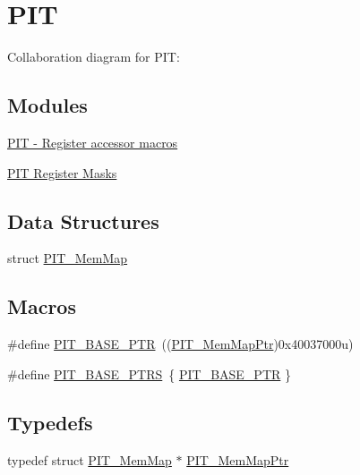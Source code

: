 \hypertarget{group___p_i_t___peripheral}{}\section{P\+IT}
\label{group___p_i_t___peripheral}
Collaboration diagram for P\+IT\+:
\subsection*{Modules}
\begin{DoxyCompactItemize}
\item 
\hyperlink{group___p_i_t___register___accessor___macros}{P\+I\+T -\/ Register accessor macros}
\item 
\hyperlink{group___p_i_t___register___masks}{P\+I\+T Register Masks}
\end{DoxyCompactItemize}
\subsection*{Data Structures}
\begin{DoxyCompactItemize}
\item 
struct \hyperlink{struct_p_i_t___mem_map}{P\+I\+T\+\_\+\+Mem\+Map}
\end{DoxyCompactItemize}
\subsection*{Macros}
\begin{DoxyCompactItemize}
\item 
\#define \hyperlink{group___p_i_t___peripheral_ga70be45f58402a8e6d2ce4df7b23aa41c}{P\+I\+T\+\_\+\+B\+A\+S\+E\+\_\+\+P\+TR}~((\hyperlink{group___p_i_t___peripheral_ga4efe9d2676c775562cb282254af9a937}{P\+I\+T\+\_\+\+Mem\+Map\+Ptr})0x40037000u)
\item 
\#define \hyperlink{group___p_i_t___peripheral_ga403e0ed71b80cfe3e085fe6b56b5eff0}{P\+I\+T\+\_\+\+B\+A\+S\+E\+\_\+\+P\+T\+RS}~\{ \hyperlink{group___p_i_t___peripheral_ga70be45f58402a8e6d2ce4df7b23aa41c}{P\+I\+T\+\_\+\+B\+A\+S\+E\+\_\+\+P\+TR} \}
\end{DoxyCompactItemize}
\subsection*{Typedefs}
\begin{DoxyCompactItemize}
\item 
typedef struct \hyperlink{struct_p_i_t___mem_map}{P\+I\+T\+\_\+\+Mem\+Map} $\ast$ \hyperlink{group___p_i_t___peripheral_ga4efe9d2676c775562cb282254af9a937}{P\+I\+T\+\_\+\+Mem\+Map\+Ptr}
\end{DoxyCompactItemize}


